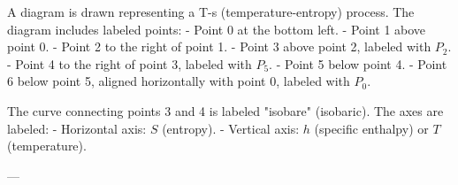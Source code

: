 A diagram is drawn representing a T-s (temperature-entropy) process. The diagram includes labeled points:  
- Point 0 at the bottom left.  
- Point 1 above point 0.  
- Point 2 to the right of point 1.  
- Point 3 above point 2, labeled with \( P_2 \).  
- Point 4 to the right of point 3, labeled with \( P_5 \).  
- Point 5 below point 4.  
- Point 6 below point 5, aligned horizontally with point 0, labeled with \( P_0 \).  

The curve connecting points 3 and 4 is labeled "isobare" (isobaric).  
The axes are labeled:  
- Horizontal axis: \( S \) (entropy).  
- Vertical axis: \( h \) (specific enthalpy) or \( T \) (temperature).  

---